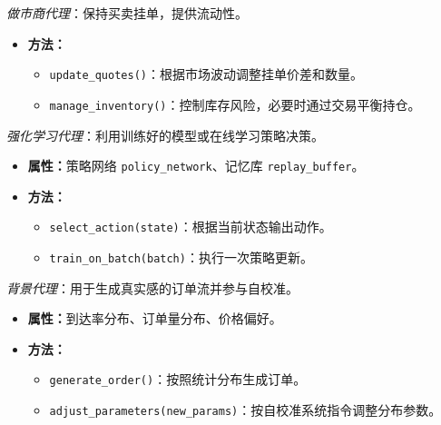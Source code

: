 \begin{description}
\begin{itemize}
\begin{itemize}
      \end{itemize}
  \end{itemize}
  \item[MarketMaker] \emph{做市商代理}：保持买卖挂单，提供流动性。
  \begin{itemize}
    \item \textbf{方法：}
      \begin{itemize}
        \item \verb|update_quotes()|：根据市场波动调整挂单价差和数量。
        \item \verb|manage_inventory()|：控制库存风险，必要时通过交易平衡持仓。
      \end{itemize}
  \end{itemize}
  \item[RLAgent] \emph{强化学习代理}：利用训练好的模型或在线学习策略决策。
  \begin{itemize}
    \item \textbf{属性：}策略网络 \verb|policy_network|、记忆库 \verb|replay_buffer|。
    \item \textbf{方法：}
      \begin{itemize}
        \item \verb|select_action(state)|：根据当前状态输出动作。
        \item \verb|train_on_batch(batch)|：执行一次策略更新。
      \end{itemize}
  \end{itemize}
  \item[BackgroundAgent] \emph{背景代理}：用于生成真实感的订单流并参与自校准。
  \begin{itemize}
    \item \textbf{属性：}到达率分布、订单量分布、价格偏好。
    \item \textbf{方法：}
      \begin{itemize}
        \item \verb|generate_order()|：按照统计分布生成订单。
        \item \verb|adjust_parameters(new_params)|：按自校准系统指令调整分布参数。
      \end{itemize}
  \end{itemize}
\end{description}

